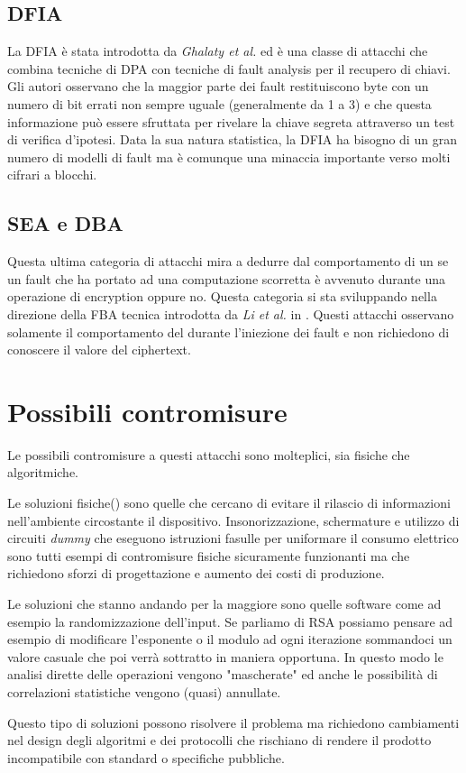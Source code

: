 		\subsection*{\ac{DFIA}}
			La \ac{DFIA} è stata introdotta da \emph{Ghalaty et al.}\cite{ghalaty2014differential} ed è una classe di attacchi che combina tecniche di \ac{DPA} con tecniche di fault analysis per il recupero di chiavi\cite{fuhr2013fault}. Gli autori osservano che la maggior parte dei fault restituiscono byte con un numero di bit errati non sempre uguale (generalmente da 1 a 3) e che questa informazione può essere sfruttata per rivelare la chiave segreta attraverso un test di verifica d'ipotesi. Data la sua natura statistica, la \ac{DFIA} ha bisogno di un gran numero di modelli di fault ma è comunque una minaccia importante verso molti cifrari a blocchi.
			
		\subsection*{\ac{SEA} e \ac{DBA}}
			Questa ultima categoria di attacchi mira a dedurre dal comportamento di un \disps se un fault che ha portato ad una computazione scorretta è avvenuto durante una operazione di encryption oppure no\cite{robisson2007differential}. Questa categoria si sta sviluppando nella direzione della \ac{FBA} tecnica introdotta da \emph{Li et al.} in \cite{li2014yet}. Questi attacchi osservano solamente il comportamento del \disps durante l'iniezione dei fault e non richiedono di conoscere il valore del ciphertext.
			
	\section{Possibili contromisure}	
		Le possibili contromisure a questi attacchi sono molteplici, sia fisiche che algoritmiche.
		
		Le soluzioni fisiche(\cite{anderson1996tamper,shamir2000protecting,tuyls2006read,tiri2002dynamic}) sono quelle che cercano di evitare il rilascio di informazioni nell'ambiente circostante il dispositivo. Insonorizzazione, schermature e utilizzo di circuiti \emph{dummy} che eseguono istruzioni fasulle per uniformare il consumo elettrico sono tutti esempi di contromisure fisiche sicuramente funzionanti ma che richiedono sforzi di progettazione e aumento dei costi di produzione.
		
		Le soluzioni che stanno andando per la maggiore sono quelle software come ad esempio la randomizzazione dell'input\cite{boscher2012randomized}. Se parliamo di RSA possiamo pensare ad esempio di modificare l'esponente o il modulo ad ogni iterazione sommandoci un valore casuale che poi verrà sottratto in maniera opportuna. In questo modo le analisi dirette delle operazioni vengono "mascherate" ed anche le possibilità di correlazioni statistiche vengono (quasi) annullate.
		
		Questo tipo di soluzioni possono risolvere il problema ma richiedono cambiamenti nel design degli algoritmi e dei protocolli che rischiano di rendere il prodotto incompatibile con standard o specifiche pubbliche.